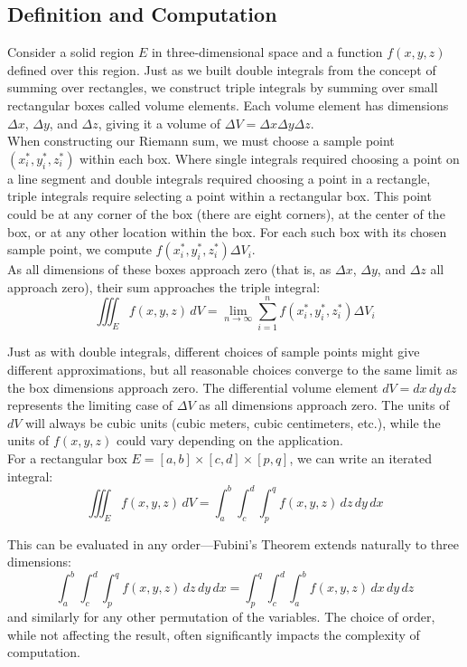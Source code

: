 \subsection*{Definition and Computation}

\noindent Consider a solid region $E$ in three-dimensional space and a function $f(x,y,z)$ defined over this region. Just as we built double integrals from the concept of summing over rectangles, we construct triple integrals by summing over small rectangular boxes called volume elements. Each volume element has dimensions $\Delta x$, $\Delta y$, and $\Delta z$, giving it a volume of $\Delta V = \Delta x\Delta y\Delta z$. \\

\noindent When constructing our Riemann sum, we must choose a sample point $(x_i^*, y_i^*, z_i^*)$ within each box. Where single integrals required choosing a point on a line segment and double integrals required choosing a point in a rectangle, triple integrals require selecting a point within a rectangular box. This point could be at any corner of the box (there are eight corners), at the center of the box, or at any other location within the box. For each such box with its chosen sample point, we compute $f(x_i^*, y_i^*, z_i^*)\Delta V_i$. \\

\noindent As all dimensions of these boxes approach zero (that is, as $\Delta x$, $\Delta y$, and $\Delta z$ all approach zero), their sum approaches the triple integral:
\[
\iiint_E f(x,y,z)\,dV = \lim_{n \to \infty} \sum_{i=1}^n f(x_i^*, y_i^*, z_i^*)\Delta V_i
\]

\noindent Just as with double integrals, different choices of sample points might give different approximations, but all reasonable choices converge to the same limit as the box dimensions approach zero. The differential volume element $dV = dx\,dy\,dz$ represents the limiting case of $\Delta V$ as all dimensions approach zero. The units of $dV$ will always be cubic units (cubic meters, cubic centimeters, etc.), while the units of $f(x,y,z)$ could vary depending on the application. \\

\noindent For a rectangular box $E = [a,b] \times [c,d] \times [p,q]$, we can write an iterated integral:
\[
\iiint_E f(x,y,z)\,dV = \int_a^b\int_c^d\int_p^q f(x,y,z)\,dz\,dy\,dx
\]

\noindent This can be evaluated in any order—Fubini's Theorem extends naturally to three dimensions:
\[
\int_a^b\int_c^d\int_p^q f(x,y,z)\,dz\,dy\,dx = \int_p^q\int_c^d\int_a^b f(x,y,z)\,dx\,dy\,dz
\]
and similarly for any other permutation of the variables. The choice of order, while not affecting the result, often significantly impacts the complexity of computation. \\

